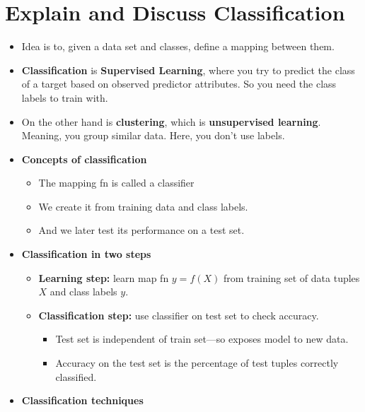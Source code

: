 
\section{Explain and Discuss Classification}
\begin{multicols}{2}
\begin{itemize}
\item
  Idea is to, given a data set and classes, define a mapping between
  them.
\item
  \textbf{Classification} is \textbf{Supervised Learning}, where you try
  to predict the class of a target based on observed predictor
  attributes. So you need the class labels to train with.
\item
  On the other hand is \textbf{clustering}, which is
  \textbf{unsupervised learning}. Meaning, you group similar data. Here,
  you don't use labels.
\item
  \textbf{Concepts of classification}
  \begin{itemize}
    \item
    The mapping fn is called a classifier
  \item
    We create it from training data and class labels.
  \item
    And we later test its performance on a test set.
  \end{itemize}
\item
  \textbf{Classification in two steps}

  \begin{itemize}
    \item
    \textbf{Learning step:} learn map fn \(y=f(X)\) from training set of
    data tuples \(X\) and class labels \(y\).
  \item
    \textbf{Classification step:} use classifier on test set to check
    accuracy.

    \begin{itemize}
        \item
      Test set is independent of train set---so exposes model to new
      data.
    \item
      Accuracy on the test set is the percentage of test tuples
      correctly classified.
    \end{itemize}
  \end{itemize}
\item
  \textbf{Classification techniques}


\end{itemize}
\end{multicols}
